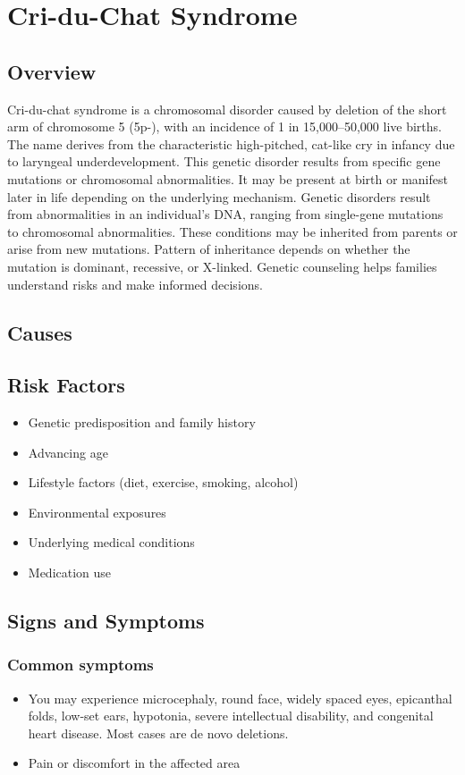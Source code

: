 \chapter{Cri-du-Chat Syndrome}
\label{sec:Cri-du-Chat Syndrome}

\section{Overview}
Cri-du-chat syndrome is a chromosomal disorder caused by deletion of the short arm of chromosome 5 (5p-), with an incidence of 1 in 15,000--50,000 live births. The name derives from the characteristic high-pitched, cat-like cry in infancy due to laryngeal underdevelopment. This genetic disorder results from specific gene mutations or chromosomal abnormalities. It may be present at birth or manifest later in life depending on the underlying mechanism. Genetic disorders result from abnormalities in an individual's DNA, ranging from single-gene mutations to chromosomal abnormalities. These conditions may be inherited from parents or arise from new mutations. Pattern of inheritance depends on whether the mutation is dominant, recessive, or X-linked. Genetic counseling helps families understand risks and make informed decisions.
\section{Causes}
\section{Risk Factors}

\begin{itemize}[noitemsep]
  \item Genetic predisposition and family history
  \item Advancing age
  \item Lifestyle factors (diet, exercise, smoking, alcohol)
  \item Environmental exposures
  \item Underlying medical conditions
  \item Medication use
\end{itemize}
\section{Signs and Symptoms}

\subsection{Common symptoms}
\begin{itemize}[noitemsep]
  \item You may experience microcephaly, round face, widely spaced eyes, epicanthal folds, low-set ears, hypotonia, severe intellectual disability, and congenital heart disease. Most cases are de novo deletions.

  \item Pain or discomfort in the affected area
  \end{itemize}

